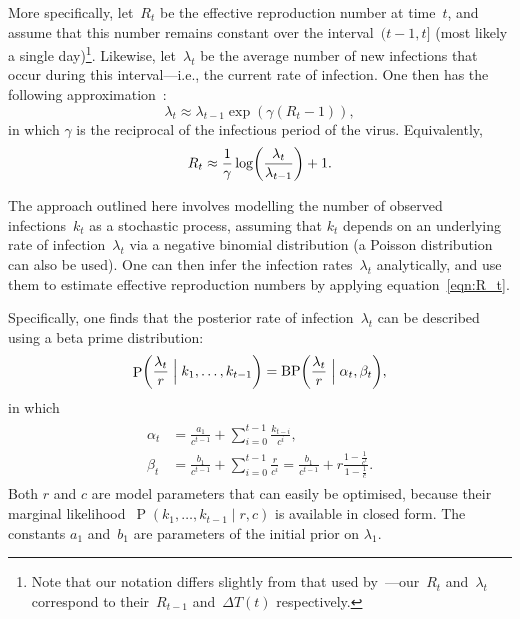 \documentclass[12pt,a4paper]{article}
\DeclareMathOperator\Pb{P}                    %
\DeclarePairedDelimiter\lr{\lparen}{\rparen}  %
\DeclareMathOperator\BP{BP}                   %
\begin{document}
More specifically, let~$R_t$ be the effective reproduction number at time~$t$,
and assume that this number remains constant over the interval~$(t-1, t]$ (most
likely a single day)\footnote{Note that our notation differs slightly from that
used by~\citeauthor{bettencourt2008}---our~$R_t$ and~$\lambda_t$ correspond to
their~$R_{t-1}$ and~$\Delta T(t)$ respectively.}. Likewise, let~$\lambda_t$ be
the average number of new infections that occur during this interval---i.e., the
current rate of infection. One then has the following
approximation~\cite{bettencourt2008}:
\begin{equation*}
  \lambda_t \approx \lambda_{t-1}\exp(\gamma(R_t - 1)),
\end{equation*}
in which $\gamma$ is the reciprocal of the infectious period of the virus.
Equivalently,
\begin{equation}\label{eqn:R_t}
  R_t \approx \frac{1}{\gamma} \log\lr*{\frac{\lambda_t}{\lambda_{t-1}}} + 1.
\end{equation}

The approach outlined here involves modelling the number of observed
infections~$k_t$ as a stochastic process, assuming that $k_t$ depends on an
underlying rate of infection~$\lambda_t$ via a negative binomial distribution (a
Poisson distribution can also be used). One can then infer the infection
rates~$\lambda_t$ analytically, and use them to estimate effective reproduction
numbers by applying equation~\eqref{eqn:R_t}.

Specifically, one finds that the posterior rate of infection~$\lambda_t$ can be
described using a beta prime distribution:
\begin{equation*}
  \Pb\lr*{\frac{\lambda_t}{r} \Bigm\vert k_1, \dots, k_{t-1}}
  = \BP\lr*{\frac{\lambda_t}{r} \Bigm\vert \alpha_t, \beta_t},
\end{equation*}
in which
\begin{align}\label{eqn:recursion}
\begin{split}    
    \alpha_t &= \frac{a_1}{c^{t-1}} + \sum_{i=0}^{t-1} \frac{k_{t-i}}{c^i}, \\
    \beta_t &= \frac{b_1}{c^{t-1}} + \sum_{i=0}^{t-1} \frac{r}{c^i}
    = \frac{b_1}{c^{t-1}} + r\frac{1 - \frac{1}{c^t}}{1 - \frac{1}{c}}.
\end{split}
\end{align}
Both $r$ and $c$ are model parameters that can easily be optimised, because
their marginal likelihood~$\Pb(k_1, \dots, k_{t-1} \mid r, c)$ is available in
closed form. The constants $a_1$ and~$b_1$ are parameters of the initial prior
on $\lambda_1$.
\end{document}
